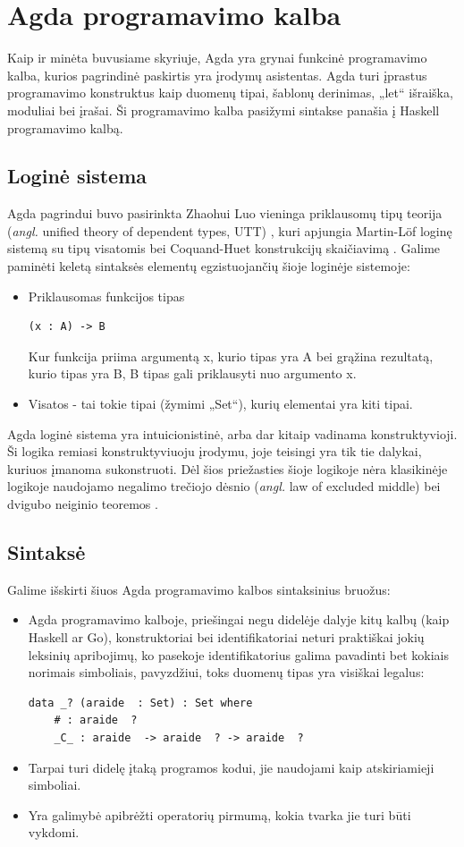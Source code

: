 \documentclass{VUMIFPSbakalaurinis}
\begin{document}
\section{Agda programavimo kalba}
Kaip ir minėta buvusiame skyriuje, Agda yra grynai funkcinė programavimo kalba, kurios pagrindinė paskirtis yra įrodymų asistentas. Agda turi įprastus programavimo konstruktus kaip duomenų tipai, šablonų derinimas, „let“ išraiška, moduliai bei įrašai. Ši programavimo kalba pasižymi sintakse panašia į Haskell programavimo kalbą.
\subsection{Loginė sistema}
Agda pagrindui buvo pasirinkta Zhaohui Luo vieninga priklausomų tipų teorija (\textit{angl.} unified theory of dependent types, UTT) \cite{agdaInitial}, kuri apjungia Martin-Löf loginę sistemą su tipų visatomis bei Coquand-Huet konstrukcijų skaičiavimą \cite{schematicApproach}. Galime paminėti keletą sintaksės elementų egzistuojančių šioje loginėje sistemoje:
\begin{itemize}
	\item{ Priklausomas funkcijos tipas
		\begin{lstlisting}
(x : A) -> B
		\end{lstlisting}
		Kur funkcija priima argumentą x, kurio tipas yra A bei grąžina rezultatą, kurio tipas yra B, B tipas gali priklausyti nuo argumento x.
	}
	\item Visatos - tai tokie tipai (žymimi „Set“), kurių elementai yra kiti tipai.
\end{itemize}
Agda loginė sistema yra intuicionistinė, arba dar kitaip vadinama konstruktyvioji. Ši logika remiasi konstruktyviuoju įrodymu, joje teisingi yra tik tie dalykai, kuriuos įmanoma sukonstruoti. Dėl šios priežasties šioje logikoje nėra klasikinėje logikoje naudojamo negalimo trečiojo dėsnio (\textit{angl.} law of excluded middle) bei dvigubo neiginio teoremos \cite{intuitionistic}.
\subsection{Sintaksė}
Galime išskirti šiuos Agda programavimo kalbos sintaksinius bruožus:
\begin{itemize}
	\item {Agda programavimo kalboje, priešingai negu didelėje dalyje kitų kalbų (kaip Haskell ar Go), konstruktoriai bei identifikatoriai neturi praktiškai jokių leksinių apribojimų, ko pasekoje identifikatorius galima pavadinti bet kokiais norimais simboliais, pavyzdžiui, toks duomenų tipas yra visiškai legalus:
	\begin{lstlisting}
data _? (araide  : Set) : Set where
	# : araide  ?
	_C_ : araide  -> araide  ? -> araide  ?
	\end{lstlisting}
	}
	\item Tarpai turi didelę įtaką programos kodui, jie naudojami kaip atskiriamieji simboliai.
	\item Yra galimybė apibrėžti operatorių pirmumą, kokia tvarka jie turi būti vykdomi.
\end{itemize}
\end{document}
